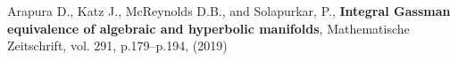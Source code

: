 \documentclass{article}
\begin{document}
\begin{thebibliography}{1}
		Arapura D., Katz J., McReynolds D.B., and Solapurkar, P.,
			\textbf{Integral Gassman equivalence of algebraic and hyperbolic manifolds}, Mathematische Zeitschrift, vol. 291, p.179--p.194, (2019)
\end{thebibliography}
\end{document}

